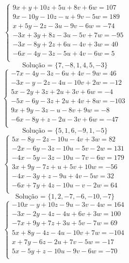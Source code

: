 \documentclass[12pt,oneside,a4paper]{article}
\begin{document}
\vspace{\baselineskip}
\begin{equation*}
\begin{cases}
9x+y+10z+5u+8v+6w=107 \\
9x-10y-10z-u+9v-5w=189 \\
x+5y-2z-3u-9v-6w=-74 \\
-3x+3y+8z-3u-5v+7w=-95 \\
-3x-8y+2z+6u-4v+3w=40 \\
-6x-4y-3z-5u+4v-6w=5 \\
\end{cases}
\end{equation*}
\begin{equation*}
\text{Solução = }\{7,-8,1,4,5,-3\}
\end{equation*}
\vspace{\baselineskip}
\begin{equation*}
\begin{cases}
-7x-4y-3z-6u+4v-9w=46 \\
-3x-y-2z-4u-10v+2w=-12 \\
5x-2y+3z+2u+3v+6w=-4 \\
-5x-6y-3z+2u+4v+8w=-103 \\
9x+9y-3z-u-8v+9w=-8 \\
-6x-8y+z-2u-3v+6w=-47 \\
\end{cases}
\end{equation*}
\begin{equation*}
\text{Solução = }\{5,1,6,-9,1,-5\}
\end{equation*}
\vspace{\baselineskip}
\begin{equation*}
\begin{cases}
5x-8y-2z-10u-4v+3w=82 \\
-2x-6y-3z-10u-5v-2w=131 \\
-4x-5y-3z-10u-7v-6w=179 \\
3x+9y-7z+u+5v+10w=-56 \\
-4x-3y+z-9u+4v-5w=32 \\
-6x+7y+4z-10u-v-2w=64 \\
\end{cases}
\end{equation*}
\begin{equation*}
\text{Solução = }\{1,2,-7,-6,-10,-7\}
\end{equation*}
\vspace{\baselineskip}
\begin{equation*}
\begin{cases}
-10x-y+10z-9u-3v-4w=164 \\
-3x-2y-4z-4u+6v+3w=100 \\
-7x+9y+7z+3u+5v-7w=69 \\
5x+8y-4z-4u-10v+7w=-104 \\
x+7y-6z-2u+7v-5w=-17 \\
5x-5y+z-10u-9v-6w=-70 \\
\end{cases}
\end{equation*}
\end{document}
